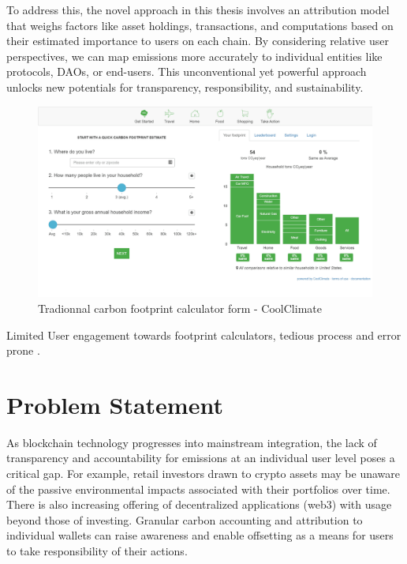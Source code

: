 \documentclass[11pt]{report}
\begin{document}
To address this, the novel approach in this thesis involves an attribution model that weighs factors like asset holdings, transactions, and computations based on their estimated importance to users on each chain. By considering relative user perspectives, we can map emissions more accurately to individual entities like protocols, DAOs, or end-users. This unconventional yet powerful approach unlocks new potentials for transparency, responsibility, and sustainability.

\begin{figure}[hbt!]
    \centering
    \centerline{\includegraphics[scale=0.25]{figures/carbon_footprint_calculator.png}}
    \caption[YO]{Tradionnal carbon footprint calculator form - CoolClimate\footnotemark}
    \label{fig:carbon_footprint_calculator}
\end{figure}


Limited User engagement towards footprint calculators, tedious process and error prone \cite{saloOpportunitiesLimitationsCarbon2019,mulrowStateCarbonFootprint2019}.

\section{Problem Statement}

As blockchain technology progresses into mainstream integration, the lack of transparency and accountability for emissions at an individual user level poses a critical gap. For example, retail investors drawn to crypto assets may be unaware of the passive environmental impacts associated with their portfolios over time. There is also increasing offering of decentralized applications (web3) with usage beyond those of investing. Granular carbon accounting and attribution to individual wallets can raise awareness and enable offsetting as a means for users to take responsibility of their actions.
\end{document}
